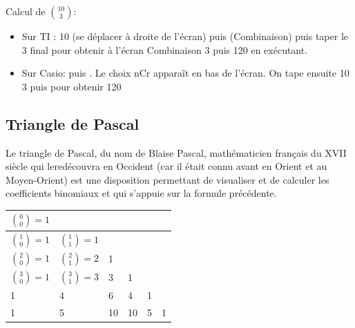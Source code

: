 \documentclass[french]{book}
\begin{document}
\begin{rem} Calcul de $\binom{10}{3}$:
\begin{itemize}
\item Sur TI : 10  (se déplacer à droite de l'écran) puis    (Combinaison) puis taper le 3 final pour obtenir à l'écran  Combinaison 3 \fg{} puis 120 en exécutant.

\item Sur Casio:   puis . Le choix nCr apparaît en bas de l'écran. On tape ensuite 10  3 puis  pour obtenir 120 
\end{itemize}
\end{rem}
\subsection{Triangle de Pascal}


\begin{prop}
 Le triangle de Pascal, du nom de Blaise Pascal, mathématicien français du XVII siècle qui le\og{}redécouvra\fg{} en Occident (car il était connu avant en Orient et au Moyen-Orient) est une disposition permettant de visualiser et de calculer les coefficients binomiaux et qui s'appuie sur la formule précédente.
\begin{center}
 \begin{tabular}{|p{1.5cm}|p{1.5cm}|p{1.5cm}|p{1.5cm}|p{1.5cm}|p{1.5cm}|}
\hline
  $\binom{0}{0}=1$ & & & & &\\
\hline
$\binom{1}{0}=1$ & $\binom{1}{1}=1$ & & & &\\
\hline
$\binom{2}{0}=1$ & $\binom{2}{1}=2$ & 1 & & &\\
\hline
$\binom{3}{0}=1$ & $\binom{3}{1}=3$ & 3 & 1 & & \\
\hline
1 & 4 & 6 & 4 & 1 &\\
\hline
1 & 5 & 10 & 10 & 5 & 1\\
\hline
 \end{tabular}
 
\end{center} 

\end{prop} 
\end{document}
